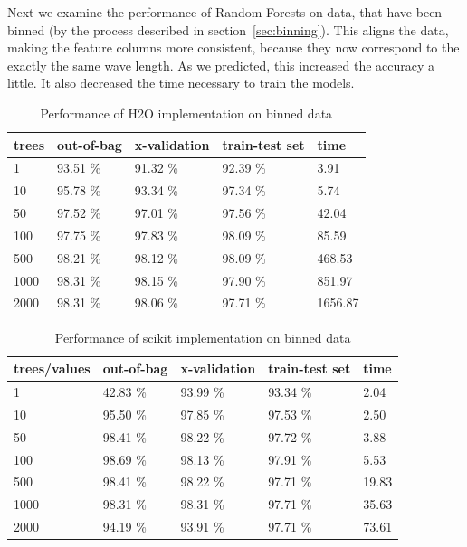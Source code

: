 \documentclass[thesis=B,english]{FITthesis}[2012/10/20]
\begin{document}
Next we examine the performance of Random Forests on data, that have been binned (by the process described in section~\ref{sec:binning}). This aligns the data, making the feature columns more consistent, because they now correspond to the exactly the same wave length. As we predicted, this increased the accuracy a little. It also decreased the time necessary to train the models.

\begin{table}[h]
\begin{tabular}{|l|l|l|l|l|}
\hline
trees        & out-of-bag & x-validation & train-test set & time \\ \hline
1            &93.51 \%            &91.32 \%              &92.39 \%                 & 3.91        \\ \hline
10           &95.78 \%            &93.34 \%              &97.34   \%                 & 5.74       \\ \hline
50           &97.52 \%            &97.01 \%              &97.56 \%                 & 42.04      \\ \hline
100          &97.75 \%            &97.83 \%              &98.09 \%                 & 85.59      \\ \hline
500          &98.21 \%            &98.12 \%              &98.09 \%                 & 468.53    \\ \hline
1000         &98.31 \%            &98.15 \%               &97.90 \%                 & 851.97        \\ \hline
2000         &98.31 \%            &98.06 \%              &97.71 \%                 & 1656.87       \\ \hline
\end{tabular}
\caption{Performance of H2O implementation on binned data}
\label{tab:h2o-binned}
\end{table}
\begin{table}[h]
\begin{tabular}{|l|l|l|l|l|}
\hline
trees/values & out-of-bag & x-validation & train-test set & time \\ \hline
1            &42.83 \%           &93.99 \%              &93.34 \%                & 2.04          \\ \hline
10           &95.50 \%           &97.85 \%              &97.53 \%                &2.50           \\ \hline
50           &98.41 \%           &98.22 \%              &97.72 \%                &3.88        \\ \hline
100          &98.69 \%           &98.13 \%              &97.91 \%                &5.53        \\ \hline
500          &98.41 \%           &98.22 \%              &97.71 \%                &19.83      \\ \hline
1000         &98.31 \%           &98.31 \%              &97.71 \%                &35.63         \\ \hline
2000         &94.19 \%           &93.91 \%              &97.71 \%                &73.61        \\ \hline
\end{tabular}
\caption{Performance of scikit implementation on binned data}
\label{tab:scikit-binned}
\end{table}
\end{document}
